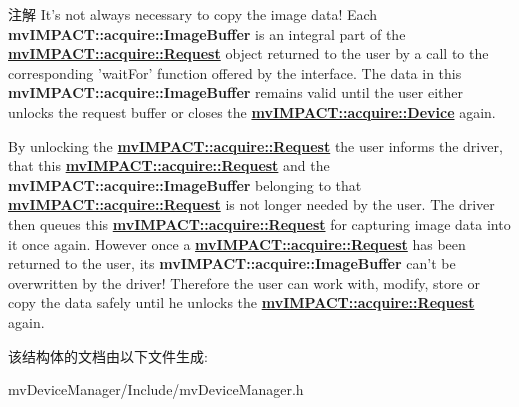 \begin{DoxyNote}{注解}
It's not always necessary to copy the image data! Each {\bfseries mv\+I\+M\+P\+A\+C\+T\+::acquire\+::\+Image\+Buffer} is an integral part of the {\bfseries \hyperlink{classmv_i_m_p_a_c_t_1_1acquire_1_1_request}{mv\+I\+M\+P\+A\+C\+T\+::acquire\+::\+Request}} object returned to the user by a call to the corresponding 'wait\+For' function offered by the interface. The data in this {\bfseries mv\+I\+M\+P\+A\+C\+T\+::acquire\+::\+Image\+Buffer} remains valid until the user either unlocks the request buffer or closes the {\bfseries \hyperlink{classmv_i_m_p_a_c_t_1_1acquire_1_1_device}{mv\+I\+M\+P\+A\+C\+T\+::acquire\+::\+Device}} again.

By unlocking the {\bfseries \hyperlink{classmv_i_m_p_a_c_t_1_1acquire_1_1_request}{mv\+I\+M\+P\+A\+C\+T\+::acquire\+::\+Request}} the user informs the driver, that this {\bfseries \hyperlink{classmv_i_m_p_a_c_t_1_1acquire_1_1_request}{mv\+I\+M\+P\+A\+C\+T\+::acquire\+::\+Request}} and the {\bfseries mv\+I\+M\+P\+A\+C\+T\+::acquire\+::\+Image\+Buffer} belonging to that {\bfseries \hyperlink{classmv_i_m_p_a_c_t_1_1acquire_1_1_request}{mv\+I\+M\+P\+A\+C\+T\+::acquire\+::\+Request}} is not longer needed by the user. The driver then queues this {\bfseries \hyperlink{classmv_i_m_p_a_c_t_1_1acquire_1_1_request}{mv\+I\+M\+P\+A\+C\+T\+::acquire\+::\+Request}} for capturing image data into it once again. However once a {\bfseries \hyperlink{classmv_i_m_p_a_c_t_1_1acquire_1_1_request}{mv\+I\+M\+P\+A\+C\+T\+::acquire\+::\+Request}} has been returned to the user, its {\bfseries mv\+I\+M\+P\+A\+C\+T\+::acquire\+::\+Image\+Buffer} can't be overwritten by the driver! Therefore the user can work with, modify, store or copy the data safely until he unlocks the {\bfseries \hyperlink{classmv_i_m_p_a_c_t_1_1acquire_1_1_request}{mv\+I\+M\+P\+A\+C\+T\+::acquire\+::\+Request}} again. 
\end{DoxyNote}


该结构体的文档由以下文件生成\+:\begin{DoxyCompactItemize}
\item 
mv\+Device\+Manager/\+Include/mv\+Device\+Manager.\+h\end{DoxyCompactItemize}
